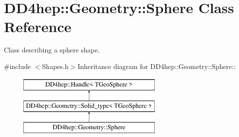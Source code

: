 \hypertarget{class_d_d4hep_1_1_geometry_1_1_sphere}{
\section{DD4hep::Geometry::Sphere Class Reference}
\label{class_d_d4hep_1_1_geometry_1_1_sphere}
}


Class describing a sphere shape.  


{\ttfamily \#include $<$Shapes.h$>$}Inheritance diagram for DD4hep::Geometry::Sphere::\begin{figure}[H]
\begin{center}
\leavevmode
\includegraphics[height=3cm]{class_d_d4hep_1_1_geometry_1_1_sphere}
\end{center}
\end{figure}
